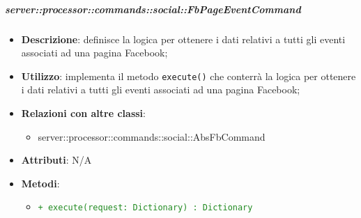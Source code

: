         \subparagraph{server::processor::commands::social::FbPageEventCommand} %
        \label{subp:bdsm_app_server_processor_commands_social_fbpageeventcommand}
        \begin{itemize}
          \item \textbf{Descrizione}: definisce la logica per ottenere i dati relativi a tutti gli eventi associati ad una pagina Facebook;
          \item \textbf{Utilizzo}: implementa il metodo \texttt{execute()} che conterrà la logica per ottenere i dati relativi a tutti gli eventi associati ad una pagina Facebook;
          \item \textbf{Relazioni con altre classi}:
            \begin{itemize}
              \item server::processor::commands::social::AbsFbCommand
            \end{itemize}
          \item \textbf{Attributi}: N/A
          \item \textbf{Metodi}:
          \begin{itemize}
              \item \textcolor{forestgreen}{\texttt{+ execute(request: Dictionary) : Dictionary}}
          \end{itemize}
        \end{itemize}

